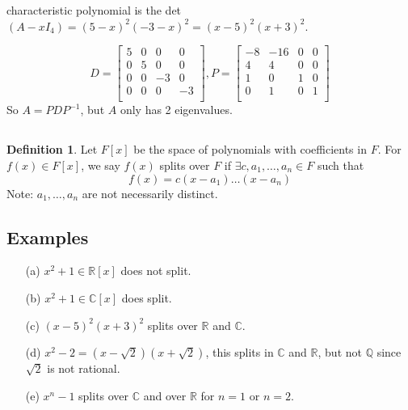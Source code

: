 \documentclass[a4paper,10pt]{article}
\theoremstyle{definition}
\newtheorem{definition}{Definition}[section]
\begin{document}
\begin{enumerate}
		characteristic polynomial is the det$(A - xI_4) = (5-x)^2(-3-x)^2 =
		(x-5)^2(x + 3)^2$. 

		$$D = 
		\begin{bmatrix}
			5 & 0 & 0 & 0 \\
			0 & 5 & 0 & 0 \\
			0 & 0 & -3 & 0 \\
			0 & 0 & 0 & -3 \\
		\end{bmatrix}
		,
		P = 
		\begin{bmatrix}
			-8 & -16 & 0 & 0 \\
			4 & 4 & 0 & 0 \\
			1 & 0 & 1 & 0 \\
			0 & 1 & 0 & 1 \\
		\end{bmatrix}
		$$
		So $A=PDP^{-1}$, but $A$ only has 2 eigenvalues.
\end{enumerate}

\subsection{}
\begin{definition}
	Let $F[x]$ be the space of polynomials with coefficients in $F$. For $f(x)
	\in F[x]$, we say $f(x)$ splits over $F$ if $\exists c,a_1,\ldots,a_n \in F$
	such that 
	$$f(x) = c(x-a_1)\ldots(x-a_n)$$
	Note: $a_1,\ldots, a_n$ are not necessarily distinct.
\end{definition}

\subsection{Examples}
\begin{enumerate}
	\item[(a)] $x^2 + 1 \in \mathbb{R}[x]$ does not split. 

	\item[(b)]
		$x^2 + 1 \in
		\mathbb{C}[x]$ does split.
	\item[(c)] $(x-5)^2(x +3)^2$ splits over $\mathbb{R}$ and $\mathbb{C}$.
	\item[(d)] $x^2 - 2 = (x - \sqrt{2})(x + \sqrt{2})$, this splits in
		$\mathbb{C}$ and $\mathbb{R}$, but not $\mathbb{Q}$ since $\sqrt{2}$ is
		not rational.
	\item[(e)] $x^n -1$ splits over $\mathbb{C}$ and over $\mathbb{R}$ for $n =
		1$ or $n = 2$.
\end{enumerate}
\end{document}
